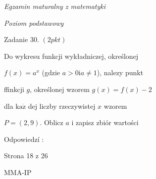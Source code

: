 \documentclass[a4paper,12pt]{article}
\begin{document}
{\it Egzamin maturalny z matematyki}

{\it Poziom podstawowy}

Zadanie 30. $(2pkt)$

Do wykresu funkcji wykładniczej, określonej

$f(x)=a^{x}$ (gdzie $a>0 \mathrm{i} a\neq 1$), nalezy punkt

ffinkcji $g$, określonej wzorem $g(x)=f(x)-2$

dla $\mathrm{k}\mathrm{a}\dot{\mathrm{z}}$ dej liczby rzeczywistej $x$ wzorem

$P=(2,9)$. Oblicz $a$ i zapisz zbiór wartości

Odpowiedzí :

Strona 18 z 26

MMA-IP
\end{document}
